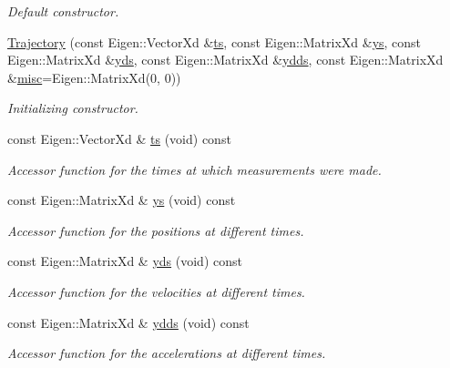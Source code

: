 \begin{DoxyCompactItemize}
\begin{DoxyCompactList}\small\item\em Default constructor. \end{DoxyCompactList}\item 
\hyperlink{classDmpBbo_1_1Trajectory_a24a5ff3377cbb89550d629c9b92b9fb0}{Trajectory} (const Eigen\+::\+Vector\+Xd \&\hyperlink{classDmpBbo_1_1Trajectory_a0ac526fb2e2e77134906a4b657d795d2}{ts}, const Eigen\+::\+Matrix\+Xd \&\hyperlink{classDmpBbo_1_1Trajectory_a7e10cffc4d5b8099986c835f9337eab4}{ys}, const Eigen\+::\+Matrix\+Xd \&\hyperlink{classDmpBbo_1_1Trajectory_ad5772d5db1c6af36cf1de2eed2447702}{yds}, const Eigen\+::\+Matrix\+Xd \&\hyperlink{classDmpBbo_1_1Trajectory_ac2ce234816063eeeead69a146651fef7}{ydds}, const Eigen\+::\+Matrix\+Xd \&\hyperlink{classDmpBbo_1_1Trajectory_a4bd0eca2780012731ff1b64341be1cbc}{misc}=Eigen\+::\+Matrix\+Xd(0, 0))
\begin{DoxyCompactList}\small\item\em Initializing constructor. \end{DoxyCompactList}\item 
const Eigen\+::\+Vector\+Xd \& \hyperlink{classDmpBbo_1_1Trajectory_a0ac526fb2e2e77134906a4b657d795d2}{ts} (void) const 
\begin{DoxyCompactList}\small\item\em Accessor function for the times at which measurements were made. \end{DoxyCompactList}\item 
const Eigen\+::\+Matrix\+Xd \& \hyperlink{classDmpBbo_1_1Trajectory_a7e10cffc4d5b8099986c835f9337eab4}{ys} (void) const 
\begin{DoxyCompactList}\small\item\em Accessor function for the positions at different times. \end{DoxyCompactList}\item 
const Eigen\+::\+Matrix\+Xd \& \hyperlink{classDmpBbo_1_1Trajectory_ad5772d5db1c6af36cf1de2eed2447702}{yds} (void) const 
\begin{DoxyCompactList}\small\item\em Accessor function for the velocities at different times. \end{DoxyCompactList}\item 
const Eigen\+::\+Matrix\+Xd \& \hyperlink{classDmpBbo_1_1Trajectory_ac2ce234816063eeeead69a146651fef7}{ydds} (void) const 
\begin{DoxyCompactList}\small\item\em Accessor function for the accelerations at different times. \end{DoxyCompactList}\item 

\end{DoxyCompactItemize}
